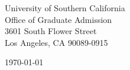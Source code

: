 \begin{minipage}{0.49\textwidth}
\begin{flushleft}
\noindent
University of Southern California \\
Office of Graduate Admission\\
3601 South Flower Street\\
Los Angeles, CA 90089-0915\\

\end{flushleft}
\end{minipage}
\begin{minipage}{0.47\textwidth}
\begin{flushright}
\today
\end{flushright}
\end{minipage} \\

\newcommand{\univ}{University of Southern California}
\newcommand{\univshort}{USC}
\newcommand{\degree}{Ph.D. degree in Computer Science}
\newcommand{\dept}{Computer Science}



